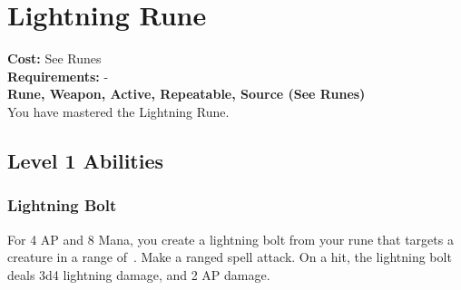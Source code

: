 \section{Lightning Rune}\label{rune:lightning}
\textbf{Cost:} See Runes\\
\textbf{Requirements:} -\\
\textbf{Rune, Weapon, Active, Repeatable, Source (See Runes)}\\
You have mastered the Lightning Rune.

\subsection{Level 1 Abilities}

\subsubsection{Lightning Bolt}
For 4 AP and 8 Mana, you create a lightning bolt from your rune that targets a creature in a range of~.
Make a ranged spell attack.
On a hit, the lightning bolt deals 3d4 lightning damage, and 2 AP damage.